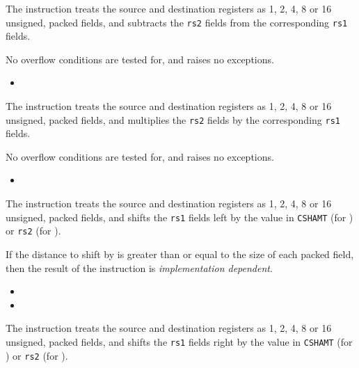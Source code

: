 The instruction  treats the source and destination registers as
1, 2, 4, 8 or 16 unsigned, packed fields, and subtracts the {\tt rs2} fields
from the corresponding {\tt rs1} fields.

No overflow conditions are tested for, and  raises no exceptions.

\begin{itemize}
\item {}
\end{itemize}

\ienc{\iencmulpx}

The instruction  treats the source and destination registers as
1, 2, 4, 8 or 16 unsigned, packed fields, and multiplies the {\tt rs2} fields
by the corresponding {\tt rs1} fields.

No overflow conditions are tested for, and  raises no exceptions.

\begin{itemize}
\item {}
\end{itemize}

\ienc{\iencsllpx\iencsllipx}

The instruction  treats the source and destination registers as
1, 2, 4, 8 or 16 unsigned, packed fields, and shifts the {\tt rs1} fields
left by the value in {\tt CSHAMT} (for ) or {\tt rs2} 
(for ).

If the distance to shift by is greater than or equal to the size of each
packed field, then the result of the  instruction is
{\em implementation dependent}.

\begin{itemize}
\item {}
\item {}
\end{itemize}

\ienc{\iencsrlpx\iencsrlipx}

The instruction  treats the source and destination registers as
1, 2, 4, 8 or 16 unsigned, packed fields, and shifts the {\tt rs1} fields
right by the value in {\tt CSHAMT} (for ) or {\tt rs2} 
(for ).

